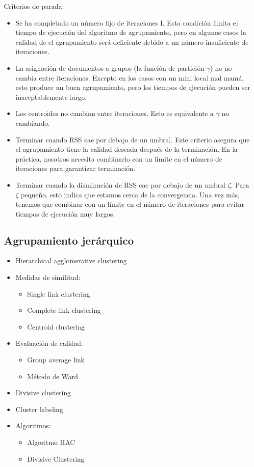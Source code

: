 \documentclass{llncs}
\begin{document}
Criterios de parada:
\begin{itemize}
	\item Se ha completado un número fijo de iteraciones I. Esta condición limita el tiempo de ejecución del algoritmo de agrupamiento, pero en algunos casos la calidad de el agrupamiento será deficiente debido a un número insuficiente de iteraciones.
	\item La asignación de documentos a grupos (la función de partición $\gamma$) no
	no cambia entre iteraciones. Excepto en los casos con un mini local mal mamá, esto produce un buen agrupamiento, pero los tiempos de ejecución pueden ser inaceptablemente
	largo.
	\item Los centroides no cambian entre iteraciones. Esto es equivalente a $\gamma$ no cambiando.
	\item Terminar cuando RSS cae por debajo de un umbral. Este criterio asegura que el agrupamiento tiene la calidad deseada después de la terminación. En la práctica, nosotros necesita combinarlo con un límite en el número de iteraciones para garantizar terminación. 
	\item Terminar cuando la disminución de RSS cae por debajo de un umbral $\zeta$. Para $\zeta$ pequeño, esto indica que estamos cerca de la convergencia. Una vez más, tenemos que combinar con un límite en el número de iteraciones para evitar tiempos de ejecución muy largos.
\end{itemize}

\subsection{Agrupamiento jer\'arquico}

\begin{itemize}
\item Hierarchical agglomerative clustering

\item Medidas de similitud:
\begin{itemize}
	\item Single link clustering
	\item Complete link clustering
	\item Centroid clustering
\end{itemize}

\item Evaluaci\'on de calidad:
\begin{itemize}
\item Group average link
\item M\'etodo de Ward
\end{itemize}

\item Divisive clustering

\item Cluster labeling

\item Algoritmos:
\begin{itemize}
	\item Algoritmo HAC
	\item Divisive Clustering
\end{itemize}
\end{itemize}
\end{document}
